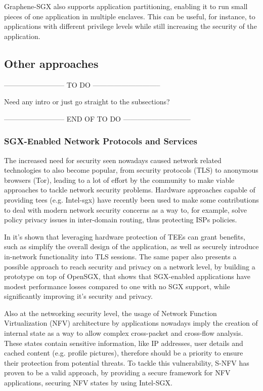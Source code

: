 Graphene-SGX also supports application partitioning, enabling it to run small pieces of one application in multiple enclaves. This can be useful, for instance, to applications with different privilege levels while still increasing the security of the application.
\subsection{Other approaches}

-------------------------- TO DO -----------------------------


Need any intro or just go straight to the subsections?

-------------------------- END OF TO DO -----------------------------


\subsubsection{SGX-Enabled Network Protocols and Services}

The increased need for security seen nowadays caused network related technologies to also become popular, from security protocols (TLS) to anonymous browsers (Tor), leading to a lot of effort by the community to make viable approaches to tackle network security problems. 
Hardware approaches capable of providing \gls{tee}s (e.g. Intel-\gls{sgx}) have recently been used to make some contributions to deal with modern network security concerns as a way to, for example, solve policy privacy issues in inter-domain routing, thus protecting ISPs policies.

In \cite{torSGXPaper} it’s shown that leveraging hardware protection of TEEs can grant benefits, such as simplify the overall design of the application, as well as securely introduce in-network functionality into TLS sessions. The same paper also presents a possible approach to reach security and privacy on a network level, by building a prototype on top of OpenSGX, that shows that SGX-enabled applications have modest performance losses compared to one with no SGX support, while significantly improving it’s security and privacy.

Also at the networking security level, the usage of Network Function Virtualization (NFV) architecture by applications nowadays imply the creation of internal state as a way to allow complex cross-packet and cross-flow analysis. 
These states contain sensitive information, like IP addresses, user details and cached content (e.g. profile pictures), therefore should be a priority to ensure their protection from potential threats.
To tackle this vulnerability, S-NFV \cite{sNFVPaper} has proven to be a valid approach, by providing a secure framework for NFV applications, securing NFV states by using Intel-SGX.

